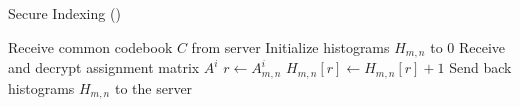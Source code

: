 \begin{algorithm}[t]
\caption{Secure Indexing (\SecInd)}
\label{alg:sec_indexing}
\begin{algorithmic}[1]


      
    \State Receive common codebook $C$ from server 
    \State Initialize histograms $H_{m,n}$ to $0$ 
    \State Receive and decrypt assignment matrix $A^i$ %
            \State $r \leftarrow A^i_{m, n}$ 
            \State $H_{m, n}[r] \leftarrow H_{m, n}[r] + 1$ 
        \EndFor
    \EndFor
    \State Send back histograms $H_{m, n}$ to the server
\EndProcedure
\end{algorithmic}
\end{algorithm}





